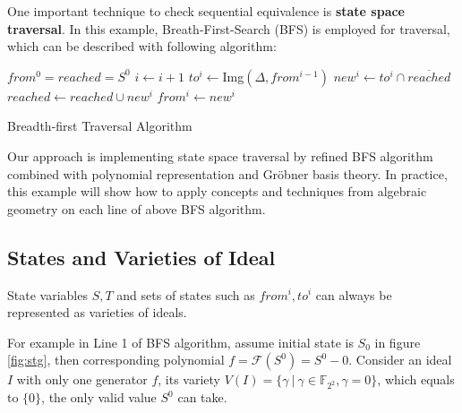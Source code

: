 One important technique to check sequential equivalence is \textbf{state space traversal}. In this example,
Breath-First-Search (BFS) is employed for traversal, which can be described with following algorithm\cite{KallaPartialScan}:

\begin{algorithm}[hbt]
\SetAlgoNoLine

  $from^0 = reached = S^0$\;
  {
  	$i \gets i + 1$\;
	$to^i \gets$Img$(\Delta, from^{i-1})$\;
	$new^i \gets to^i \cap \overline{reached}$\;
  	$reached \gets reached \cup new^i$\;
	$from^i \gets new^i$\;
  }
\caption {Breadth-first Traversal Algorithm}\label{alg:BFS}
\end{algorithm}

Our approach is implementing state space traversal by refined BFS algorithm combined with polynomial representation
and Gr\"obner basis theory. In practice, this example will show how to apply concepts and techniques from algebraic
geometry on each line of above BFS algorithm.

\subsection{States and Varieties of Ideal}

\begin{Theorem}
State variables $S, T$ and sets of states such as $from^i, to^i$ can always be represented as varieties of ideals.
\end{Theorem}
For example in Line 1 of BFS algorithm, assume initial state is $S_0$ in figure \ref{fig:stg}, then corresponding
polynomial $f = \mathcal{F}(S^0) = S^0 - 0$. Consider an ideal $I$ with only one generator $f$, its variety
$V(I) = \{\gamma\ |\ \gamma \in \mathbb{F}_{2^2}, \gamma = 0\}$, which equals to $\{0\}$, the only
valid value $S^0$ can take.

